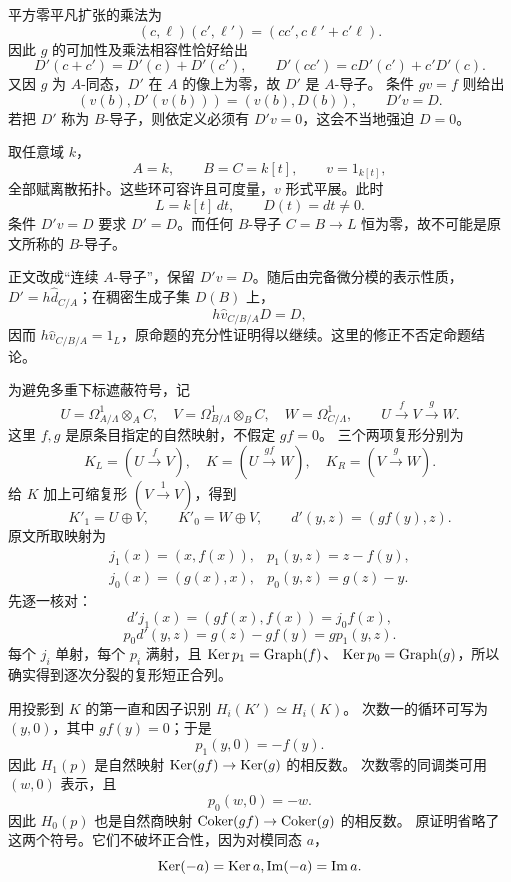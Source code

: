 平方零平凡扩张的乘法为
\[
 (c,\ell)(c',\ell')=(cc',c\ell'+c'\ell).
\]
因此 $g$ 的可加性及乘法相容性恰好给出
\[
 D'(c+c')=D'(c)+D'(c'),\qquad
 D'(cc')=cD'(c')+c'D'(c).
\]
又因 $g$ 为 $A$-同态，$D'$ 在 $A$ 的像上为零，故 $D'$ 是 $A$-导子。
条件 $gv=f$ 则给出
\[
 (v(b),D'(v(b)))=(v(b),D(b)),
 \qquad D'v=D.
\]
若把 $D'$ 称为 $B$-导子，则依定义必须有 $D'v=0$，这会不当地强迫 $D=0$。

取任意域 $k$，
\[
 A=k,\qquad B=C=k[t],\qquad v=1_{k[t]},
\]
全部赋离散拓扑。这些环可容许且可度量，$v$ 形式平展。此时
\[
 L=k[t]\,dt,\qquad D(t)=dt\ne0.
\]
条件 $D'v=D$ 要求 $D'=D$。而任何 $B$-导子 $C=B\to L$ 恒为零，故不可能是原文所称的 $B$-导子。

正文改成“连续 $A$-导子”，保留 $D'v=D$。随后由完备微分模的表示性质，
$D'=h\widehat d_{C/A}$；在稠密生成子集 $D(B)$ 上，
\[
 h\widehat v_{C/B/A}D=D,
\]
因而 $h\widehat v_{C/B/A}=1_L$，原命题的充分性证明得以继续。这里的修正不否定命题结论。

为避免多重下标遮蔽符号，记
\[
 U=\Omega^1_{A/\Lambda}\otimes_A C,\quad
 V=\Omega^1_{B/\Lambda}\otimes_B C,\quad W=\Omega^1_{C/\Lambda},
 \qquad U\xrightarrow f V\xrightarrow g W.
\]
这里 $f,g$ 是原条目指定的自然映射，不假定 $gf=0$。
三个两项复形分别为
\[
 K_L=(U\xrightarrow fV),\quad K=(U\xrightarrow{gf}W),\quad
 K_R=(V\xrightarrow gW).
\]
给 $K$ 加上可缩复形 $(V\xrightarrow1V)$，得到
\[
 K'_1=U\oplus V,\qquad K'_0=W\oplus V,\qquad
 d'(y,z)=(gf(y),z).
\]
原文所取映射为
\[
 \begin{array}{ll}
 j_1(x)=(x,f(x)),&p_1(y,z)=z-f(y),\\
 j_0(x)=(g(x),x),&p_0(y,z)=g(z)-y.
 \end{array}
\]
先逐一核对：
\[
 d'j_1(x)=(gf(x),f(x))=j_0f(x),
\]
\[
 p_0d'(y,z)=g(z)-gf(y)=gp_1(y,z).
\]
每个 $j_i$ 单射，每个 $p_i$ 满射，且
$\operatorname{Ker} p_1=\operatorname{Graph}(f)$、
$\operatorname{Ker} p_0=\operatorname{Graph}(g)$，所以确实得到逐次分裂的复形短正合列。

用投影到 $K$ 的第一直和因子识别 $H_i(K')\simeq H_i(K)$。
次数一的循环可写为 $(y,0)$，其中 $gf(y)=0$；于是
\[
 p_1(y,0)=-f(y).
\]
因此 $H_1(p)$ 是自然映射 $\operatorname{Ker}(gf)\to\operatorname{Ker}(g)$ 的相反数。
次数零的同调类可用 $(w,0)$ 表示，且
\[
 p_0(w,0)=-w.
\]
因此 $H_0(p)$ 也是自然商映射 $\operatorname{Coker}(gf)\to\operatorname{Coker}(g)$ 的相反数。
原证明省略了这两个符号。它们不破坏正合性，因为对模同态 $a$，
\[
 \operatorname{Ker}(-a)=\operatorname{Ker} a,\operatorname{Im}(-a)=\operatorname{Im} a.
\]

